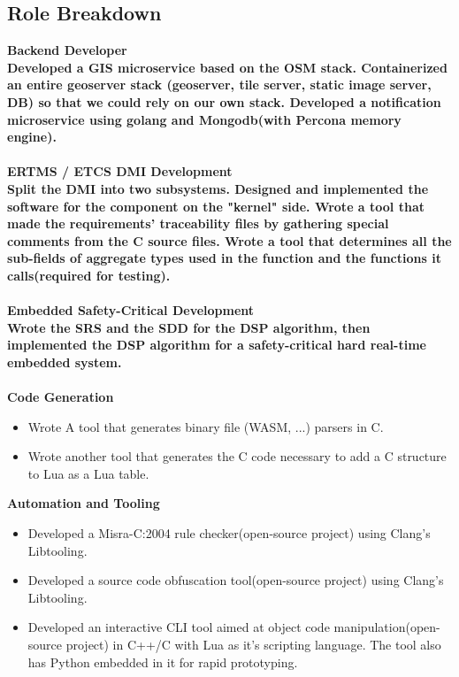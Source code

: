 \documentclass[8pt]{article}
\begin{document}
\begin{multicols}{2}
  \section*{Role Breakdown}
  \bf Backend Developer\\ \normalfont Developed a GIS microservice based on the OSM stack. Containerized an entire geoserver stack (geoserver, tile server, static image server, DB) so that we could rely on our own stack. Developed a notification microservice using golang and Mongodb(with Percona memory engine).
  \\[5pt]\\
  \bf ERTMS / ETCS DMI Development\\ \normalfont Split the DMI into two subsystems. Designed and implemented the software for the component on the "kernel" side. Wrote a tool that made the requirements' traceability files by gathering special comments from the C source files. Wrote a tool that determines all the sub-fields of aggregate types used in the function and the functions it calls(required for testing).
  \\[5pt]\\
  \bf Embedded Safety-Critical Development\\ \normalfont Wrote the SRS and the SDD for the DSP algorithm, then implemented the DSP algorithm for a safety-critical hard real-time embedded system.
  \\[5pt]\\
  \bf Code Generation\\ \begin{itemize}\normalfont
    \vspace{-\baselineskip}
  \item Wrote A tool that generates binary file (WASM, ...) parsers in C.
  \item Wrote another tool that generates the C code necessary to add a C structure to Lua as a Lua table.
\end{itemize}
\bf Automation and Tooling\\ \begin{itemize}\normalfont
  \vspace{-\baselineskip}
\item Developed a Misra-C:2004 rule checker(open-source project) using Clang's Libtooling.
\item Developed a source code obfuscation tool(open-source project) using Clang's Libtooling.
\item Developed an interactive CLI tool aimed at object code manipulation(open-source project) in C++/C with Lua as it's scripting language. The tool also has Python embedded in it for rapid prototyping.

\end{itemize}
\end{multicols}
\end{document}

